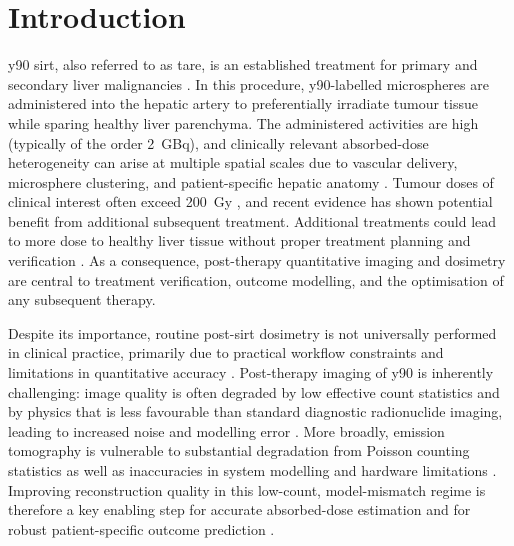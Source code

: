 \chapter{Introduction}
\label{ch:introduction}

\acrfull{y90} \acrfull{sirt}, also referred to as \acrfull{tare}, is an established treatment for primary and secondary liver malignancies \cite{sundram_selective_2017}. In this procedure, \gls{y90}-labelled microspheres are administered into the hepatic artery to preferentially irradiate tumour tissue while sparing healthy liver parenchyma. The administered activities are high (typically of the order \SI{2}{\giga\becquerel}), and clinically relevant absorbed-dose heterogeneity can arise at multiple spatial scales due to vascular delivery, microsphere clustering, and patient-specific hepatic anatomy \cite{strigari_evidence_2014}. Tumour doses of clinical interest often exceed \SI{200}{\gray} \cite{salem_clinical_2019}, and recent evidence has shown potential benefit from additional subsequent treatment. Additional treatments could lead to more dose to healthy liver tissue without proper treatment planning and verification \cite{reincke_hepatic_2022}. As a consequence, post-therapy quantitative imaging and dosimetry are central to treatment verification, outcome modelling, and the optimisation of any subsequent therapy.

Despite its importance, routine post-\gls{sirt} dosimetry is not universally performed in clinical practice, primarily due to practical workflow constraints and limitations in quantitative accuracy \cite{kappadath_quantitative_2024, gear_eanm_2023}. Post-therapy imaging of \gls{y90} is inherently challenging: image quality is often degraded by low effective count statistics and by physics that is less favourable than standard diagnostic radionuclide imaging, leading to increased noise and modelling error \cite{kappadath_quantitative_2024}. More broadly, emission tomography is vulnerable to substantial degradation from Poisson counting statistics as well as inaccuracies in system modelling and hardware limitations \cite{bai_tumor_2013}. Improving reconstruction quality in this low-count, model-mismatch regime is therefore a key enabling step for accurate absorbed-dose estimation and for robust patient-specific outcome prediction \cite{davis_personalisation_2020}.


